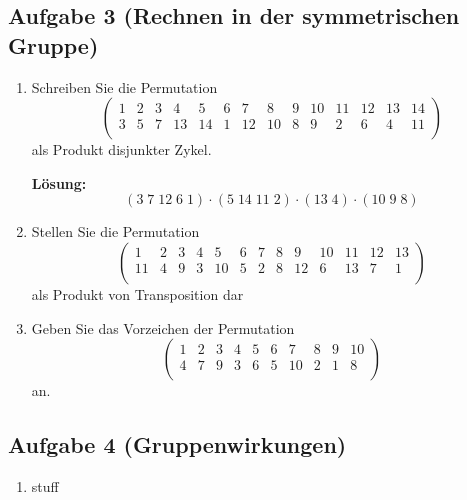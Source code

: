 \documentclass[11pt,a4paper,ngerman]{article}
\begin{document}
\subsection*{Aufgabe 3 \mdseries (Rechnen in der symmetrischen Gruppe)}

\begin{enumerate}[\bfseries a)]
\item Schreiben Sie die Permutation
$$
\left( \begin{array}{cccccccccccccc}
1 & 2 & 3 & 4 & 5 & 6 & 7 & 8 & 9 & 10 & 11 & 12 & 13 & 14  \\
3 & 5 & 7 & 13 & 14 & 1 & 12 & 10 & 8 & 9 & 2 & 6 & 4 & 11  \\
\end{array} \right)
$$
als Produkt disjunkter Zykel.

\textbf{Lösung:}\\
$$
(3 \; 7 \; 12 \; 6  \;1) \cdot (5 \;14 \;11\; 2) \cdot (13 \;4) \cdot (10\; 9\; 8)
$$


\item Stellen Sie die Permutation
$$
\left( \begin{array}{cccccccccccccc}
1 & 2 & 3 & 4 & 5 & 6 & 7 & 8 & 9 & 10 & 11 & 12 & 13  \\
11 & 4 & 9 & 3 & 10 & 5 & 2 & 8 & 12 & 6 & 13 & 7 & 1  \\
\end{array} \right)
$$
als Produkt von Transposition dar

\item Geben Sie das Vorzeichen der Permutation 
$$
\left( \begin{array}{cccccccccccccc}
1 & 2 & 3 & 4 & 5 & 6 & 7 & 8 & 9 & 10  \\
4 & 7 & 9 & 3 & 6 & 5 & 10 & 2 & 1 & 8  \\
\end{array} \right)
$$
an.

\end{enumerate}

\subsection*{Aufgabe 4 \mdseries (Gruppenwirkungen)}

\begin{enumerate}[\bfseries a)]
\item stuff
\end{enumerate}

\label{LastPage}
\end{document}
